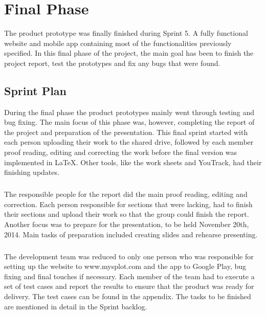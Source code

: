 \chapter{Final Phase}
\label{chap:FinalPhase}

The product prototype was finally finished during Sprint 5. A fully functional website and mobile app containing most of the functionalities previously specified. In this final phase of the project, the main goal has been to finish the project report, test the prototypes and fix any bugs that were found.

\section{Sprint Plan}
\label{sec:FinalPlan}

During the final phase the product prototypes mainly went through testing and bug fixing. The main focus of this phase was, however, completing the report of the project and preparation of the presentation. This final sprint started with each person uploading their work to the shared drive, followed by each member proof reading, editing and correcting the work before the final version was implemented in LaTeX. Other tools, like the work sheets and YouTrack, had their finishing updates.

\paragraph{} The responsible people for the report did the main proof reading, editing and correction. Each person responsible for sections that were lacking, had to finish their sections and upload their work so that the group could finish the report. Another focus was to prepare for the presentation, to be held November 20th, 2014. Main tasks of preparation included creating slides and rehearse presenting.

\paragraph{} The development team was reduced to only one person who was responsible for setting up the website to www.mysplot.com and the app to Google Play, bug fixing and final touches if necessary. Each member of the team had to execute a set of test cases and report the results to ensure that the product was ready for delivery. The test cases can be found in the appendix.
The tasks to be finished are mentioned in detail in the Sprint backlog.


